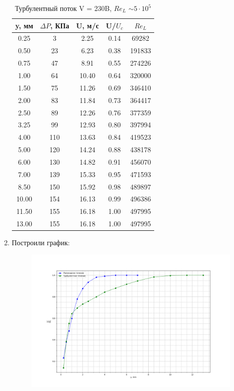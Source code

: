 \documentclass[12pt,a4paper]{article}
\begin{document}
\begin{enumerate}
    \begin{table}[h!]
        \centering
        \begin{tabular}{|c|c|c|c|c|}
        \hline
          y, мм &   $\Delta P$, КПа & U, м/с & U/$U_c$ & $Re_L$ \\ \hline
        0.25 &    3 &   2.25 &  0.14 &   69282 \\ \hline
        0.50 &   23 &   6.23 &  0.38 &  191833 \\ \hline
        0.75 &   47 &   8.91 &  0.55 &  274226 \\ \hline
        1.00 &   64 &  10.40 &  0.64 &  320000 \\ \hline
        1.50 &   75 &  11.26 &  0.69 &  346410 \\ \hline
        2.00 &   83 &  11.84 &  0.73 &  364417 \\ \hline
        2.50 &   89 &  12.26 &  0.76 &  377359 \\ \hline
        3.25 &   99 &  12.93 &  0.80 &  397994 \\ \hline
        4.00 &  110 &  13.63 &  0.84 &  419523 \\ \hline 
        5.00 &  120 &  14.24 &  0.88 &  438178 \\ \hline
        6.00 &  130 &  14.82 &  0.91 &  456070 \\ \hline
        7.00 &  139 &  15.33 &  0.95 &  471593 \\ \hline
        8.50 &  150 &  15.92 &  0.98 &  489897 \\ \hline
        10.00 &  154 &  16.13 &  0.99 &  496386 \\ \hline
        11.50 &  155 &  16.18 &  1.00 &  497995 \\ \hline 
        13.00 &  155 &  16.18 &  1.00 &  497995 \\ \hline
        \end{tabular}
        \caption{Турбулентный поток V = 230B, $Re_L$ $\sim 5 \cdot 10^{5}$}
        \label{tab:3}
    \end{table}
    \newpage
    \item Построили график:
    \begin{figure}[h!]
        \centering
        \includegraphics[width = 1 \textwidth]{plot_1.png}

\end{figure}
\end{enumerate}
\end{document}
